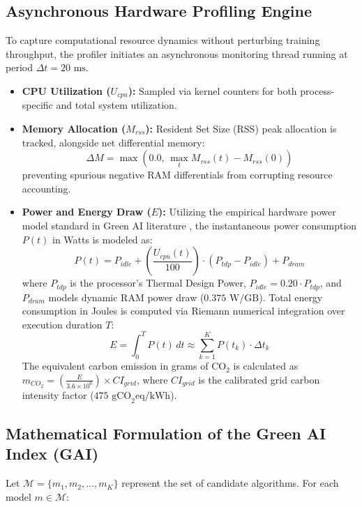 \documentclass[conference]{IEEEtran}
\begin{document}
\subsection{Asynchronous Hardware Profiling Engine}
To capture computational resource dynamics without perturbing training throughput, the profiler initiates an asynchronous monitoring thread running at period $\Delta t = 20\text{ ms}$.
\begin{itemize}
    \item \textbf{CPU Utilization ($U_{cpu}$):} Sampled via kernel counters for both process-specific and total system utilization.
    \item \textbf{Memory Allocation ($M_{rss}$):} Resident Set Size (RSS) peak allocation is tracked, alongside net differential memory:
    \begin{equation}
        \Delta M = \max\left(0.0, \, \max_{t} M_{rss}(t) - M_{rss}(0)\right)
    \end{equation}
    preventing spurious negative RAM differentials from corrupting resource accounting.
    \item \textbf{Power and Energy Draw ($E$):} Utilizing the empirical hardware power model standard in Green AI literature \cite{garcia2019estimation}, the instantaneous power consumption $P(t)$ in Watts is modeled as:
    \begin{equation}
        P(t) = P_{idle} + \left(\frac{U_{cpu}(t)}{100}\right) \cdot (P_{tdp} - P_{idle}) + P_{dram}
    \end{equation}
    where $P_{tdp}$ is the processor's Thermal Design Power, $P_{idle} = 0.20 \cdot P_{tdp}$, and $P_{dram}$ models dynamic RAM power draw ($0.375\text{ W/GB}$). Total energy consumption in Joules is computed via Riemann numerical integration over execution duration $T$:
    \begin{equation}
        E = \int_{0}^T P(t) \, dt \approx \sum_{k=1}^K P(t_k) \cdot \Delta t_k
    \end{equation}
    The equivalent carbon emission in grams of $\text{CO}_2$ is calculated as $m_{CO_2} = \left(\frac{E}{3.6 \times 10^6}\right) \times CI_{grid}$, where $CI_{grid}$ is the calibrated grid carbon intensity factor ($475\text{ gCO}_2\text{eq/kWh}$).
\end{itemize}

\subsection{Mathematical Formulation of the Green AI Index (GAI)}
Let $\mathcal{M} = \{m_1, m_2, \dots, m_K\}$ represent the set of candidate algorithms. For each model $m \in \mathcal{M}$:
\end{document}
